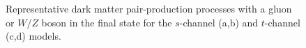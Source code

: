 \begin{figure}[t]
  \caption{Representative dark matter pair-production processes with a gluon or $W/Z$ boson in the final state for the $s$-channel (a,b) and $t$-channel (c,d) models.}
  \label{allchannel_sig_phen}
\end{figure}

